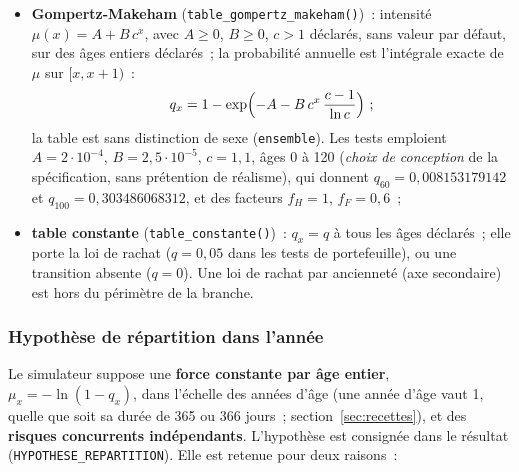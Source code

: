 \documentclass[a4paper,11pt]{article}
\newcommand{\code}[1]{\texttt{\small #1}}
\begin{document}
\begin{itemize}[leftmargin=*, itemsep=2pt]
  \item \textbf{Gompertz-Makeham} (\code{table\_gompertz\_makeham()})~: intensité
    $\mu(x) = A + B\,c^{x}$, avec $A \ge 0$, $B \ge 0$, $c > 1$ déclarés, sans
    valeur par défaut, sur des âges entiers déclarés~; la probabilité annuelle
    est l'intégrale exacte de $\mu$ sur $[x, x+1)$~:
    \[
      q_x = 1 - \exp\Bigl(-A - B\,c^{x}\,\frac{c-1}{\ln c}\Bigr)~;
    \]
    la table est sans distinction de sexe (\code{ensemble}). Les tests
    emploient $A = 2\cdot 10^{-4}$, $B = 2{,}5\cdot 10^{-5}$, $c = 1{,}1$, âges
    0 à 120 (\emph{choix de conception} de la spécification, sans prétention
    de réalisme), qui donnent $q_{60} = 0{,}008153179142$ et
    $q_{100} = 0{,}303486068312$, et des facteurs $f_H = 1$, $f_F = 0{,}6$~;
  \item \textbf{table constante} (\code{table\_constante()})~: $q_x = q$ à tous
    les âges déclarés~; elle porte la loi de rachat ($q = 0{,}05$ dans les
    tests de portefeuille), ou une transition absente ($q = 0$). Une loi de
    rachat par ancienneté (axe secondaire) est hors du périmètre de la
    branche.
\end{itemize}

\subsubsection*{Hypothèse de répartition dans l'année}

Le simulateur suppose une \textbf{force constante par âge entier},
$\mu_x = -\ln(1 - q_x)$, dans l'échelle des années d'âge (une année d'âge vaut
1, quelle que soit sa durée de 365 ou 366 jours~;
section~\ref{sec:recettes}), et des \textbf{risques concurrents
indépendants}. L'hypothèse est consignée dans le résultat
(\code{HYPOTHESE\_REPARTITION}). Elle est retenue pour deux raisons~:
\end{document}
